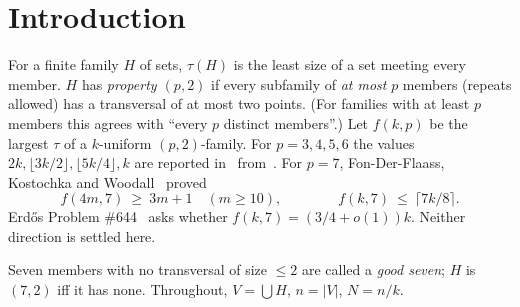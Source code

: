 \documentclass[11pt]{article}
\theoremstyle{definition}
\begin{document}
\section{Introduction}\label{sec:intro}

For a finite family $H$ of sets, $\tau(H)$ is the least size of a set meeting every member. $H$ has
\emph{property $(p,2)$} if every subfamily of \emph{at most} $p$ members (repeats allowed) has a transversal of at most
two points. (For families with at least $p$ members this agrees with ``every $p$ distinct members''.) Let $f(k,p)$ be
the largest $\tau$ of a $k$-uniform $(p,2)$-family. For $p=3,4,5,6$ the values $2k,\lfloor3k/2\rfloor,\lfloor5k/4\rfloor,k$
are reported in~\cite{EP} from~\cite{EFKT}. For $p=7$, Fon-Der-Flaass, Kostochka and Woodall~\cite{FKW} proved
\[
f(4m,7)\ \ge\ 3m+1\quad(m\ge10),\qquad\qquad f(k,7)\ \le\ \lceil 7k/8\rceil .
\]
Erd\H{o}s Problem \#644~\cite{EP} asks whether $f(k,7)=(3/4+o(1))k$. Neither direction is settled here.

Seven members with no transversal of size $\le2$ are called a \emph{good seven}; $H$ is $(7,2)$ iff it has none.
Throughout, $V=\bigcup H$, $n=|V|$, $N=n/k$.
\end{document}
